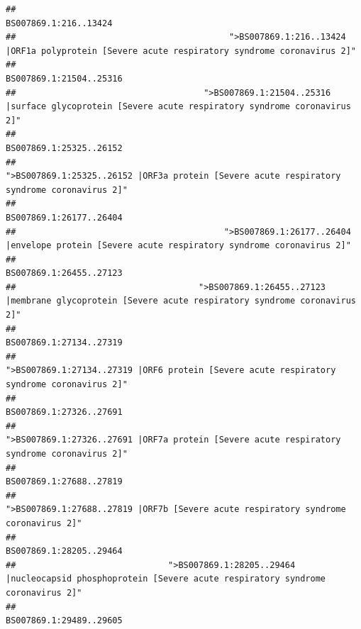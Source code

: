 \documentclass[
]{article}
\begin{document}
\begin{verbatim}
##                                                                                                                  BS007869.1:216..13424 
##                                          ">BS007869.1:216..13424 |ORF1a polyprotein [Severe acute respiratory syndrome coronavirus 2]" 
##                                                                                                                BS007869.1:21504..25316 
##                                     ">BS007869.1:21504..25316 |surface glycoprotein [Severe acute respiratory syndrome coronavirus 2]" 
##                                                                                                                BS007869.1:25325..26152 
##                                            ">BS007869.1:25325..26152 |ORF3a protein [Severe acute respiratory syndrome coronavirus 2]" 
##                                                                                                                BS007869.1:26177..26404 
##                                         ">BS007869.1:26177..26404 |envelope protein [Severe acute respiratory syndrome coronavirus 2]" 
##                                                                                                                BS007869.1:26455..27123 
##                                    ">BS007869.1:26455..27123 |membrane glycoprotein [Severe acute respiratory syndrome coronavirus 2]" 
##                                                                                                                BS007869.1:27134..27319 
##                                             ">BS007869.1:27134..27319 |ORF6 protein [Severe acute respiratory syndrome coronavirus 2]" 
##                                                                                                                BS007869.1:27326..27691 
##                                            ">BS007869.1:27326..27691 |ORF7a protein [Severe acute respiratory syndrome coronavirus 2]" 
##                                                                                                                BS007869.1:27688..27819 
##                                                    ">BS007869.1:27688..27819 |ORF7b [Severe acute respiratory syndrome coronavirus 2]" 
##                                                                                                                BS007869.1:28205..29464 
##                              ">BS007869.1:28205..29464 |nucleocapsid phosphoprotein [Severe acute respiratory syndrome coronavirus 2]" 
##                                                                                                                BS007869.1:29489..29605 

\end{verbatim}
\end{document}
